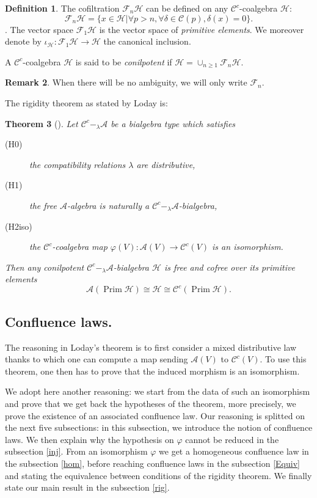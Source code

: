 \documentclass[11pt,leqno]{amsart}
\theoremstyle{definition}
\newtheorem{definition}{Definition}[subsection]
\newtheorem{remark}[definition]{Remark}
\theoremstyle{plain}
\newtheorem{theorem}[definition]{Theorem}
\newcommand{\Hc}{ \mathcal{H} }
\newcommand{\A}{ \mathcal{A} }
\newcommand{\C}{ \mathcal{C} }
\newcommand{\F}{ \mathcal{F} }
\begin{document}
\begin{definition}
The cofiltration $\F_n\Hc$ can be defined on any $\C^c$-coalgebra $\Hc$: 
\begin{equation*}
\F_n\Hc = \{x \in \Hc | \forall p >n, \forall \delta \in \C(p), \delta(x)=0\}.
\end{equation*}. The vector space $\F_1\Hc$ is the vector space of \emph{primitive elements}. We moreover denote by $\iota_\Hc : \mathcal{F}_1\Hc \rightarrow \Hc$ the canonical inclusion.

A $\C^c$-coalgebra $\Hc$ is said to be \emph{conilpotent} if $\Hc = \cup_{n \geq 1} \F_n\Hc$.
\end{definition}

\begin{remark}
When there will be no ambiguity, we will only write $\F_n$.
\end{remark}

The rigidity theorem as stated by Loday is:

\begin{theorem}[\cite{GBO}]
Let $\C^c-_{\lambda}\A$ be a bialgebra type which satisfies
\begin{description}
\item[(H0)] the compatibility relations $\lambda$ are distributive,
\item[(H1)] the free $\mathcal{A}$-algebra is naturally a $\C^c-_{\lambda}\A$-bialgebra,
\item[(H2iso)] the $\C^c$-coalgebra map $\varphi(V):\A(V) \rightarrow \C^c(V)$ is an isomorphism.
\end{description}
Then any conilpotent $\C^c-_{\lambda}\A$-bialgebra $\mathcal{H}$ is free and cofree over its primitive elements
\begin{equation*}
\A(\operatorname{Prim} \mathcal{H})\cong \mathcal{H} \cong \C^c(\operatorname{Prim} \mathcal{H}).
\end{equation*}
\end{theorem}

\subsection{Confluence laws.}

The reasoning in Loday's theorem is to first consider a mixed distributive law thanks to which one can compute a map sending $\A(V)$ to $\C^c(V)$. To use this theorem, one then has to prove that the induced morphism is an isomorphism. 


We adopt here another reasoning: we start from the data of such an isomorphism and prove that we get back the hypotheses of the theorem, more precisely, we prove the existence of an associated confluence law. Our reasoning is splitted on the next five subsections: in this subsection, we introduce the notion of confluence laws. We then explain why the hypothesis on $\varphi$ cannot be reduced in the subsection \ref{inj}. From an isomorphism $\varphi$ we get a homogeneous confluence law in the subsection \ref{hom}, before reaching confluence laws in the subsection \ref{Equiv} and stating the equivalence between conditions of the rigidity theorem. We finally state our main result in the subsection \ref{rig}.
\end{document}
